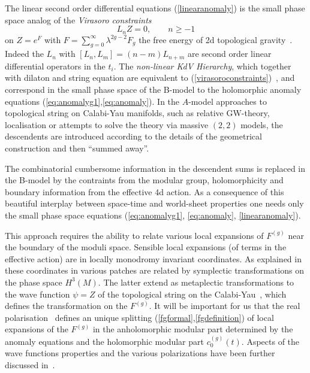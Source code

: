 \documentclass[12pt]{article}
\begin{document}
The linear second order differential equations (\ref{linearanomaly}) is the small
phase space analog of  the {\sl Virasoro constraints}
\begin{equation}
L_n Z=0, \qquad n\ge -1
\label{virasoroconstraints}
\end{equation}
on $Z=e^F$ with $F=\sum_{g=0}^\infty \lambda^{2 g-2} F_g$ the free
energy of 2d topological gravity~\cite{wittensurvey}. Indeed the
$L_n$ with $[L_n,L_m]=(n-m) L_{n+m}$ are second order linear
differential operators in the $t_i$. The {\sl non-linear KdV
Hierarchy}, which together with dilaton and string  equation are
equivalent to (\ref{virasoroconstraints})~\cite{wittensurvey}, and
correspond in the small phase space of the B-model to the
holomorphic anomaly equations
(\ref{eq:anomalyg1},\ref{eq:anomaly}). In the $A$-model approaches
to topological string on Calabi-Yau manifolds, such as relative
GW-theory, localisation or attempts to solve the theory via
massive $(2,2)$ models, the descendents are introduced according
to the details of the geometrical construction and then ``summed
away''.

The combinatorial cumbersome information in the descendent sums is
replaced in the B-model by the contraints from the modular group,
holomorphicity and boundary information from the effective 4d
action. As a consequence of this beautiful interplay between
space-time and world-sheet properties one needs only the small
phase space equations (\ref{eq:anomalyg1}, \ref{eq:anomaly},
\ref{linearanomaly}).

This approach requires the ability to relate various local
expansions of $F^{(g)}$ near the boundary of the moduli space.
Sensible local expansions (of terms in the effective action) are
in locally monodromy invariant coordinates. As explained
in~\cite{Aganagic:2006wq} these coordinates in various patches are
related by symplectic transformations on the phase space $H^3(M)$.
The latter extend as metaplectic transformations to the wave
function $\psi=Z$ of the topological string on the
Calabi-Yau~\cite{wittenwavefunction}, which defines the
transformation on the $F^{(g)}$. It will be important for us that
the real
polarisation~\cite{Verlinde:2004ck,Aganagic:2006wq,Gunaydin:2006bz}
defines an unique splitting (\ref{fgformal},\ref{fgdefinition}) of
local expansions of the $F^{(g)}$ in the anholomorphic modular
part determined by the anomaly equations and the holomorphic
modular part $c^{(g)}_0(t)$. Aspects of the wave functions
properties and the various polarizations have been further
discussed
in~\cite{Verlinde:2004ck,Aganagic:2006wq,Gunaydin:2006bz}.
\end{document}
